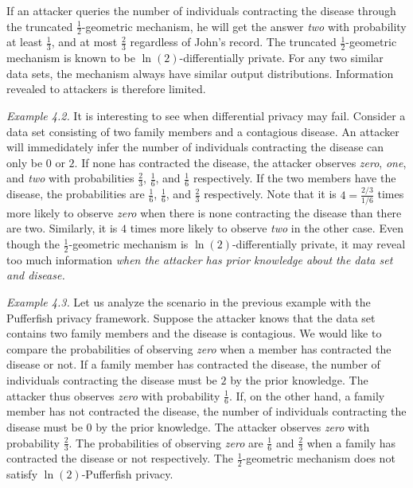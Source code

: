 If an attacker queries the number of individuals contracting the
disease through the truncated $\frac{1}{2}$-geometric mechanism,
he will get the answer \textit{two} with probability at least
$\frac{1}{3}$, and at most $\frac{2}{3}$ regardless of John's record. The truncated
$\frac{1}{2}$-geometric mechanism is known to be
$\ln(2)$-differentially private. For any two similar data sets, the
mechanism always have similar output distributions. Information
revealed to attackers is therefore limited.

\noindent
\textit{Example 4.2.}
It is interesting to see when differential privacy may fail. Consider
a data set consisting of two family members and a contagious
disease. An attacker will immedidately infer the number of individuals
contracting the disease can only be $0$ or $2$. If none has contracted
the disease, the attacker observes \textit{zero}, \textit{one}, and
\textit{two} with probabilities $\frac{2}{3}$, $\frac{1}{6}$, and
$\frac{1}{6}$ respectively. If the two members have the disease, the
probabilities are $\frac{1}{6}$, $\frac{1}{6}$, and $\frac{2}{3}$
respectively. Note that it is $4 = \frac{2/3}{1/6}$ times more likely
to observe \textit{zero} when there is none contracting the disease
than there are two. Similarly, it is $4$ times more likely to observe
\textit{two} in the other case. Even though the
$\frac{1}{2}$-geometric mechanism is $\ln(2)$-differentially private,
it may reveal too much information \emph{when the attacker has prior
 knowledge about the data set and disease.}


\noindent
\textit{Example 4.3.}
Let us analyze the scenario in the previous example with the
Pufferfish privacy framework. Suppose the attacker knows that the data
set contains two family members and the disease is contagious. We
would like to compare the probabilities of observing \textit{zero}
when a member has contracted the disease or not. If a family member
has contracted the disease, the number of individuals contracting
the disease must be $2$ by the prior knowledge. The attacker thus
observes \textit{zero} with probability $\frac{1}{6}$.
If, on the other hand, a family member has not contracted
the disease, the number of individuals contracting the disease must be
$0$ by the prior knowledge. The attacker observes \textit{zero}
with probability $\frac{2}{3}$. The probabilities of observing
\textit{zero} are $\frac{1}{6}$ and $\frac{2}{3}$ when a family
has contracted the disease or not respectively. The
$\frac{1}{2}$-geometric mechanism does not satisfy
$\ln(2)$-Pufferfish privacy.

